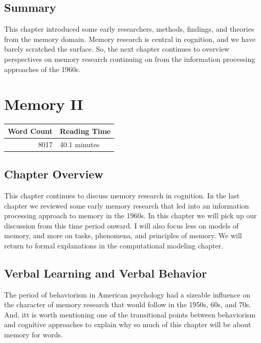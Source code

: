 \documentclass[
  oneside,
  12pt]{crumpbook}
\begin{document}
\hypertarget{summary-1}{%
\section{Summary}\label{summary-1}}

This chapter introduced some early researchers, methods, findings, and theories from the memory domain. Memory research is central in cognition, and we have barely scratched the surface. So, the next chapter continues to overview perspectives on memory research continuing on from the information processing approaches of the 1960s.

\hypertarget{memory-ii}{%
\chapter{Memory II}\label{memory-ii}}

\begin{tabular}{r|l}
\hline
Word Count & Reading Time\\
\hline
8017 & 40.1 minutes\\
\hline
\end{tabular}

\hypertarget{chapter-overview-6}{%
\section{Chapter Overview}\label{chapter-overview-6}}

This chapter continues to discuss memory research in cognition. In the last chapter we reviewed some early memory research that led into an information processing approach to memory in the 1960s. In this chapter we will pick up our discussion from this time period onward. I will also focus less on models of memory, and more on tasks, phenomena, and principles of memory. We will return to formal explanations in the computational modeling chapter.

\hypertarget{verbal-learning-and-verbal-behavior}{%
\section{Verbal Learning and Verbal Behavior}\label{verbal-learning-and-verbal-behavior}}

The period of behaviorism in American psychology had a sizeable influence on the character of memory research that would follow in the 1950s, 60s, and 70s. And, itt is worth mentioning one of the transitional points between behaviorism and cognitive approaches to explain why so much of this chapter will be about memory for words.
\end{document}
